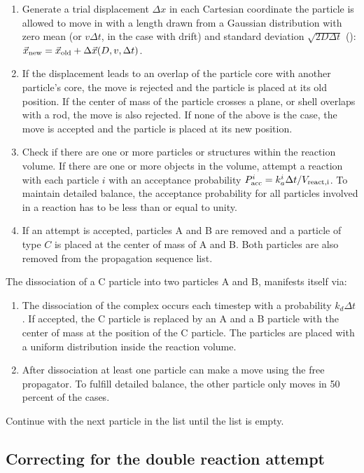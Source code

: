 \begin{enumerate}
\item Generate a trial displacement $\Delta x$ in each Cartesian coordinate the particle is allowed to move in with a length drawn from a Gaussian distribution with zero mean (or $v \Delta t$, in the case with drift) and standard deviation $\sqrt{2D\Delta t}$ (): $\vec{x}_{\rm new} = \vec{x}_{\rm old} + \Delta \vec{x}(D,v,\Delta t)$.
\item If the displacement leads to an overlap of the particle core with another particle's core, the move is rejected and the particle is placed at its old position. If the center of mass of the particle crosses a plane, or shell overlaps with a rod, the move is also rejected. If none of the above is the case, the move is accepted and the particle is placed at its new position.
\item Check if there are one or more particles or structures within the reaction volume. If there are one or more objects in the volume, attempt a reaction with each particle $i$ with an acceptance probability $P_{\rm acc}^i = k_{a}^i \Delta t/V_{\rm react, i}$. To maintain detailed balance, the acceptance probability for all particles involved in a reaction has to be less than or equal to unity. 
\item If an attempt is accepted, particles A and B are removed and a particle of type $C$ is placed at the center of mass of A and B. Both particles are also removed from the propagation sequence list. 
\end{enumerate}

The dissociation of a C particle into two particles A and B, manifests itself via:

\begin{enumerate}
\item The dissociation of the complex occurs each timestep with a probability $k_d \Delta t$. If accepted, the C particle is replaced by an A and a B particle with the center of mass at the position of the C particle. The particles are placed with a uniform distribution inside the reaction volume.
\item After dissociation at least one particle can make a move using the free propagator. To fulfill detailed balance, the other particle only moves in 50 percent of the cases. 
\end{enumerate}
Continue with the next particle in the list until the list is empty.


\subsection{Correcting for the double reaction attempt}

